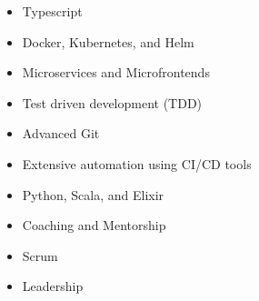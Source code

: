 \divider

\begin{itemize}
    \item Typescript
    \item Docker, Kubernetes, and Helm
    \item Microservices and Microfrontends
    \item Test driven development (TDD)
    \item Advanced Git
    \item Extensive automation using CI/CD tools
    \item Python, Scala, and Elixir
\end{itemize}

\divider

\begin{itemize}
    \item Coaching and Mentorship
    \item Scrum
    \item Leadership
\end{itemize}





